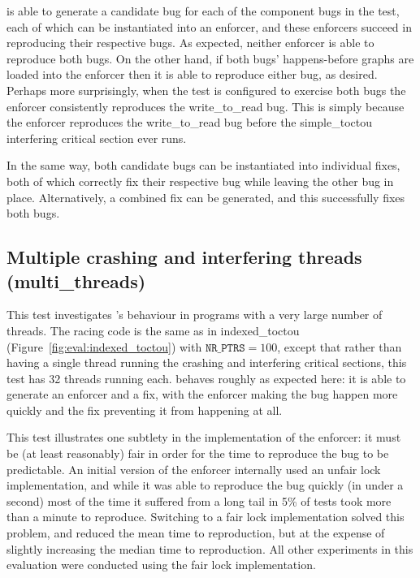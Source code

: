 {\Implementation} is able to generate a candidate bug for each of the
component bugs in the test, each of which can be instantiated into an
enforcer, and these enforcers succeed in reproducing their respective
bugs.  As expected, neither enforcer is able to reproduce both bugs.
On the other hand, if both bugs' happens-before graphs are loaded into
the enforcer then it is able to reproduce either bug, as desired.
Perhaps more surprisingly, when the test is configured to exercise
both bugs the enforcer consistently reproduces the write\_to\_read
bug.  This is simply because the enforcer reproduces the
write\_to\_read bug before the simple\_toctou interfering critical
section ever runs.

In the same way, both candidate bugs can be instantiated into
individual fixes, both of which correctly fix their respective bug
while leaving the other bug in place.  Alternatively, a combined fix
can be generated, and this successfully fixes both bugs.

\subsection{Multiple crashing and interfering threads (multi\_threads)}

This test investigates {\implementation}'s behaviour in programs with
a very large number of threads.  The racing code is the same as in
indexed\_toctou (Figure~\ref{fig:eval:indexed_toctou}) with
$\texttt{NR\_PTRS} = 100$, except that rather than having a single
thread running the crashing and interfering critical sections, this
test has 32 threads running each.  {\Technique} behaves roughly as
expected here: it is able to generate an enforcer and a fix, with the
enforcer making the bug happen more quickly and the fix preventing it
from happening at all.

This test illustrates one subtlety in the implementation of the
enforcer: it must be (at least reasonably) fair in order for the time
to reproduce the bug to be predictable.  An initial version of the
enforcer internally used an unfair lock implementation, and while it
was able to reproduce the bug quickly (in under a second) most of the
time it suffered from a long tail in 5\% of tests took more than a
minute to reproduce.  Switching to a fair lock implementation solved
this problem, and reduced the mean time to reproduction, but at the
expense of slightly increasing the median time to reproduction.
  All other experiments in
this evaluation were conducted using the fair lock implementation.

